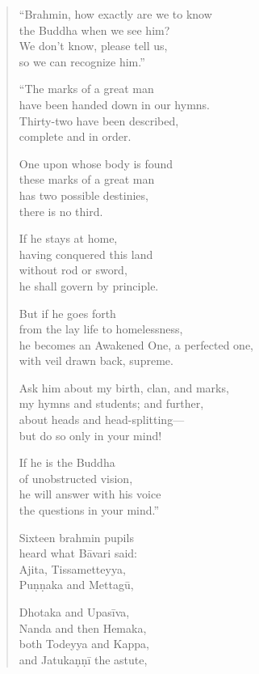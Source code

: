 \documentclass[12pt,openany]{book}%
\begin{document}
\begin{verse}
“Brahmin, how exactly are we to know \\
the Buddha when we see him? \\
We don’t know, please tell us, \\
so we can recognize him.” 

“The marks of a great man \\
have been handed down in our hymns. \\
Thirty-two have been described, \\
complete and in order. 

One upon whose body is found \\
these marks of a great man \\
has two possible destinies, \\
there is no third. 

If he stays at home, \\
having conquered this land \\
without rod or sword, \\
he shall govern by principle. 

But if he goes forth \\
from the lay life to homelessness, \\
he becomes an Awakened One, a perfected one, \\
with veil drawn back, supreme. 

Ask him about my birth, clan, and marks, \\
my hymns and students; and further, \\
about heads and head-splitting—\\
but do so only in your mind! 

If he is the Buddha \\
of unobstructed vision, \\
he will answer with his voice \\
the questions in your mind.” 

Sixteen brahmin pupils \\
heard what \textsanskrit{Bāvari} said: \\
Ajita, Tissametteyya, \\
\textsanskrit{Puṇṇaka} and \textsanskrit{Mettagū}, 

Dhotaka and \textsanskrit{Upasīva}, \\
Nanda and then Hemaka, \\
both Todeyya and Kappa, \\
and \textsanskrit{Jatukaṇṇī} the astute, 


\end{verse}
\end{document}
